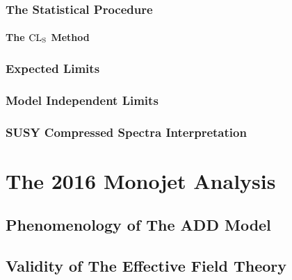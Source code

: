 \documentclass[10pt,twoside,cucitura,classica,english,openany]{toptesi}
\begin{document}
% 

\subsection{The Statistical Procedure}
\label{sec:stat-proc}



\subsubsection{The $\mathrm{CL}_\mathrm{S}$ Method}
\label{sec:cls-method}



\subsection{Expected Limits}
\label{sec:expected-limits}



\subsection{Model Independent Limits}
\label{sec:model-indep-limits}



\subsection{SUSY Compressed Spectra Interpretation}
\label{sec:interpretation}



\chapter{The 2016 Monojet Analysis}
\label{cha:2016-monoj-analys}

\section{Phenomenology of The ADD Model}
\label{sec:phen-add-model}



\section{Validity of The Effective Field Theory}
\label{sec:valid-effect-field}
\end{document}
